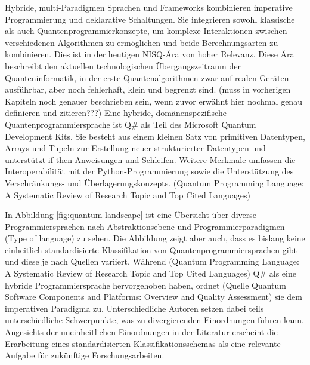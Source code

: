 Hybride, multi-Paradigmen Sprachen und Frameworks kombinieren imperative Programmierung und deklarative Schaltungen. Sie integrieren sowohl klassische als auch Quantenprogrammierkonzepte, um komplexe Interaktionen zwischen verschiedenen Algorithmen zu ermöglichen und beide Berechnungsarten zu kombinieren. Dies ist in der heutigen NISQ-Ära von hoher Relevanz. Diese Ära beschreibt den aktuellen technologischen Übergangszeitraum der Quanteninformatik, in der erste Quantenalgorithmen zwar auf realen Geräten ausführbar, aber noch fehlerhaft, klein und begrenzt sind. (muss in vorherigen Kapiteln noch genauer beschrieben sein, wenn zuvor erwähnt hier nochmal genau definieren und zitieren???) Eine hybride, domänenspezifische Quantenprogrammiersprache ist Q\# als Teil des Microsoft Quantum Development Kits. Sie besteht aus einem kleinen Satz von primitiven Datentypen, Arrays und Tupeln zur Erstellung neuer strukturierter Datentypen und unterstützt if-then Anweisungen und Schleifen. Weitere Merkmale umfassen die Interoperabilität mit der Python-Programmierung sowie die Unterstützung des Verschränkungs- und Überlagerungskonzepts. 
(Quantum Programming Language: A Systematic Review of Research Topic and Top Cited Languages)

In Abbildung \ref{fig:quantum-landscape} ist eine Übersicht über diverse Programmiersprachen nach Abstraktionsebene und Programmierparadigmen (Type of language) zu sehen. Die Abbildung zeigt aber auch, dass es bislang keine einheitlich standardisierte Klassifikation von Quantenprogrammiersprachen gibt und diese je nach Quellen variiert. Während (Quantum Programming Language: A Systematic Review of Research Topic and Top Cited Languages) Q\# als eine hybride Programmiersprache hervorgehoben haben, ordnet (Quelle Quantum Software Components and Platforms: Overview and Quality Assessment) sie dem imperativen Paradigma zu. Unterschiedliche Autoren setzen dabei teils unterschiedliche Schwerpunkte, was zu divergierenden Einordnungen führen kann. Angesichts der uneinheitlichen Einordnungen in der Literatur erscheint die Erarbeitung eines standardisierten Klassifikationsschemas als eine relevante Aufgabe für zukünftige Forschungsarbeiten.

